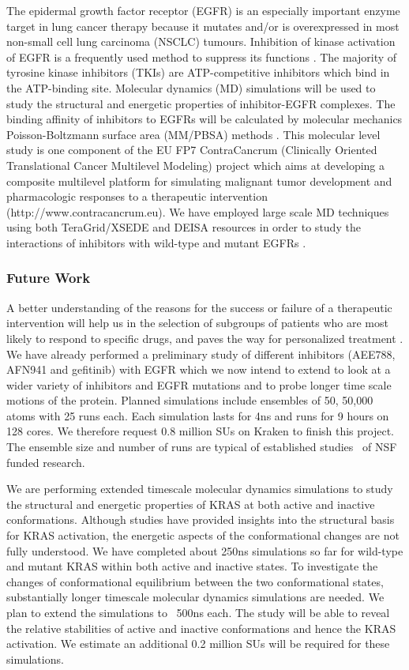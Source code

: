 \documentclass[a4paper,11pt]{article}
\begin{document}
The epidermal growth factor receptor (EGFR) is an especially important enzyme target in lung cancer therapy because it mutates and/or is overexpressed in most non-small cell lung carcinoma (NSCLC) tumours. Inhibition of kinase activation of EGFR is a frequently used method to suppress its functions \cite{bib:nature_tki}. The majority of tyrosine kinase inhibitors (TKIs) are ATP-competitive inhibitors which bind in the ATP-binding site. Molecular dynamics (MD) simulations will be used to study the structural and energetic properties of inhibitor-EGFR complexes. The binding affinity of inhibitors to EGFRs will be calculated by molecular mechanics Poisson-Boltzmann surface area (MM/PBSA) methods \cite{bib:wan_philtrans}. This molecular level study is one component of the EU FP7 ContraCancrum (Clinically Oriented Translational Cancer Multilevel Modeling) project which aims at developing a composite multilevel platform for simulating malignant tumor development and pharmacologic responses to a therapeutic intervention (http://www.contracancrum.eu). We have employed large scale MD techniques using both TeraGrid/XSEDE and DEISA resources in order to study the interactions of inhibitors with wild-type and mutant EGFRs \cite{bib:wc2009}.

\subsubsection{Future Work}
A better understanding of the reasons for the success or failure of a therapeutic intervention will help us in the selection of subgroups of patients who are most likely to respond to specific drugs, and paves the way for personalized treatment \cite{bib:hiv}. We have already performed a preliminary study of different inhibitors (AEE788, AFN941 and gefitinib) with EGFR which we now intend to extend to look at a wider variety of inhibitors and EGFR mutations and to probe longer time scale motions of the protein. Planned simulations include ensembles of 50, 50,000 atoms with 25 runs each. Each simulation lasts for 4ns and runs for 9 hours on 128 cores. We therefore request 0.8 million SUs on Kraken to finish this project. The ensemble size and number of runs are typical of established studies~\cite{bib:wan_philtrans,bib:wc2009} of NSF funded research.

We are performing extended timescale molecular dynamics simulations to study the structural and energetic properties of KRAS at both active and inactive conformations. Although studies have provided insights into the structural basis for KRAS activation, the energetic aspects of the conformational changes are not fully understood. We have completed about 250ns simulations so far for wild-type and mutant KRAS within both active and inactive states. To investigate the changes of conformational equilibrium between the two conformational states, substantially longer timescale molecular dynamics simulations are needed. We plan to extend the simulations to ~500ns each. The study will be able to reveal the relative stabilities of active and inactive conformations and hence the KRAS activation. We estimate an additional 0.2 million SUs will be required for these simulations.
\end{document}

